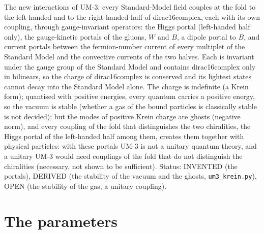 \documentclass[
  10pt,
]{article}
\begin{document}
The new interactions of UM-3: every Standard-Model field couples at the
fold to the left-handed and to the right-handed half of dirac16complex,
each with its own coupling, through gauge-invariant operators: the Higgs
portal (left-handed half only), the gauge-kinetic portals of the gluons,
\(W\) and \(B\), a dipole portal to \(B\), and current portals between
the fermion-number current of every multiplet of the Standard Model and
the convective currents of the two halves. Each is invariant under the
gauge group of the Standard Model and contains dirac16complex only in
bilinears, so the charge of dirac16complex is conserved and its lightest
states cannot decay into the Standard Model alone. The charge is
indefinite (a Krein form); quantised with positive energies, every
quantum carries a positive energy, so the vacuum is stable (whether a
gas of the bound particles is classically stable is not decided); but
the modes of positive Krein charge are ghosts (negative norm), and every
coupling of the fold that distinguishes the two chiralities, the Higgs
portal of the left-handed half among them, creates them together with
physical particles: with these portals UM-3 is not a unitary quantum
theory, and a unitary UM-3 would need couplings of the fold that do not
distinguish the chiralities (necessary, not shown to be sufficient).
Status: INVENTED (the portals), DERIVED (the stability of the vacuum and
the ghosts, \texttt{um3\_krein.py}), OPEN (the stability of the gas, a
unitary coupling).

\hypertarget{the-parameters}{%
\section{The parameters}\label{the-parameters}}
\end{document}
